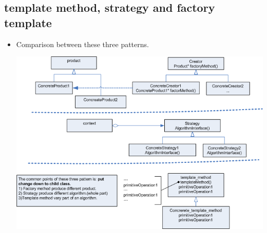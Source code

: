 \documentclass[a4paper,11pt,twoside]{book}
\begin{document}
\subsection{template method, strategy and factory template}
\begin{itemize}
	\item Comparison between these three patterns.
\begin{center}
	\includegraphics[width=0.93\linewidth]{pics/template_method.png}
\end{center}

	 
\end{itemize}
\end{document}
